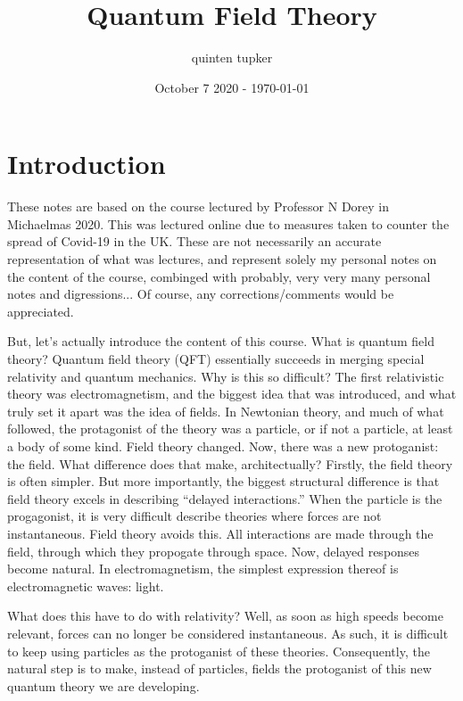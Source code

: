 \documentclass{report}
\title{Quantum Field Theory}
\author{quinten tupker}
\date{October 7 2020 - \today}
\theoremstyle{definition}
\begin{document}
\maketitle

\section*{Introduction}

These notes are based on the course lectured by Professor N Dorey in Michaelmas 2020.
This was lectured online due to measures taken to counter the spread of Covid-19
in the UK. These are not necessarily an accurate representation of what was
lectures, and represent solely my personal notes on the content of the course,
combinged with probably, very very many personal notes and digressions... Of
course, any corrections/comments would be appreciated.

But, let's actually introduce the content of this course. What is quantum field
theory? Quantum field theory (QFT) essentially succeeds in merging special
relativity
and quantum mechanics. Why is this so difficult? The first relativistic theory
was electromagnetism, and the biggest idea that was introduced, and what truly
set it apart was the idea of fields. In Newtonian theory, and much of what
followed, the protagonist of the theory was a particle, or if not a particle, at
least a body of some kind. Field theory changed. Now, there was a new
protoganist: the field. What difference does that make, architectually? Firstly,
the field theory is often simpler. But more importantly, the biggest structural
difference is that field theory excels in describing ``delayed interactions.''
When the particle is the progagonist, it is very difficult describe theories
where forces are not instantaneous. Field theory avoids this. All interactions
are made through the field, through which they propogate through space. Now,
delayed responses become natural. In electromagnetism, the simplest expression
thereof is electromagnetic waves: light. 

What does this have to do with relativity? Well, as soon as high speeds become
relevant, forces can no longer be considered instantaneous. As such, it is
difficult to keep using particles as the protoganist of these theories.
Consequently, the natural step is to make, instead of particles, fields the
protoganist of this new quantum theory we are developing.
\end{document}
